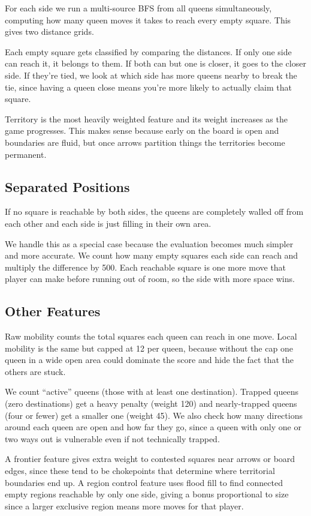 \documentclass[12pt, letterpaper]{article}
\begin{document}
For each side we run a multi-source BFS from all queens simultaneously, computing how many queen moves it takes to reach every empty square. This gives two distance grids.

Each empty square gets classified by comparing the distances. If only one side can reach it, it belongs to them. If both can but one is closer, it goes to the closer side. If they're tied, we look at which side has more queens nearby to break the tie, since having a queen close means you're more likely to actually claim that square.

Territory is the most heavily weighted feature and its weight increases as the game progresses. This makes sense because early on the board is open and boundaries are fluid, but once arrows partition things the territories become permanent.

\subsection{Separated Positions}

If no square is reachable by both sides, the queens are completely walled off from each other and each side is just filling in their own area.

We handle this as a special case because the evaluation becomes much simpler and more accurate. We count how many empty squares each side can reach and multiply the difference by 500. Each reachable square is one more move that player can make before running out of room, so the side with more space wins.

\subsection{Other Features}

Raw mobility counts the total squares each queen can reach in one move. Local mobility is the same but capped at 12 per queen, because without the cap one queen in a wide open area could dominate the score and hide the fact that the others are stuck.

We count ``active'' queens (those with at least one destination). Trapped queens (zero destinations) get a heavy penalty (weight 120) and nearly-trapped queens (four or fewer) get a smaller one (weight 45). We also check how many directions around each queen are open and how far they go, since a queen with only one or two ways out is vulnerable even if not technically trapped.

A frontier feature gives extra weight to contested squares near arrows or board edges, since these tend to be chokepoints that determine where territorial boundaries end up. A region control feature uses flood fill to find connected empty regions reachable by only one side, giving a bonus proportional to size since a larger exclusive region means more moves for that player.
\end{document}
